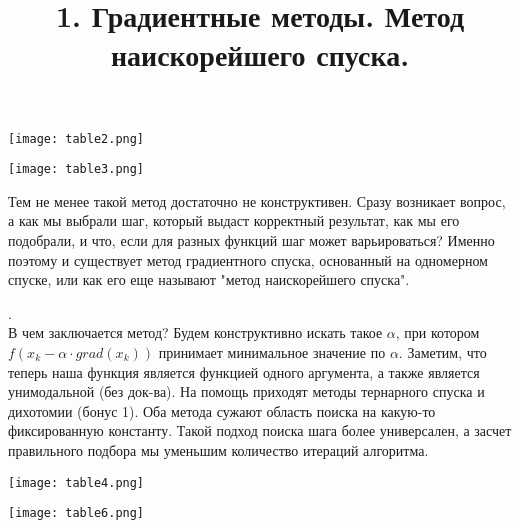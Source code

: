 \documentclass[12pt]{article}
\begin{document}
\begin{center}

\centering

\texttt{[image: table2.png]}


\label{fig:mpr}

\end{center}



\begin{center}

\centering

\texttt{[image: table3.png]}


\label{fig:mpr}

\end{center}

Тем не менее такой метод достаточно не конструктивен. Сразу возникает вопрос, а как мы выбрали шаг, который выдаст корректный результат, как мы его подобрали, и что, если для разных функций шаг может варьироваться? Именно поэтому и существует метод градиентного спуска, основанный на одномерном спуске, или как его еще называют "метод наискорейшего спуска".

\title{\textbf{1.  Градиентные методы. Метод наискорейшего спуска.}}.\\ В чем заключается метод? Будем конструктивно искать такое $\alpha$, при котором $f(x_{k} - \alpha \cdot grad(x_{k}))$ принимает минимальное значение по $\alpha$. Заметим, что теперь наша функция является функцией одного аргумента, а также является унимодальной (без док-ва). На помощь приходят методы тернарного спуска и дихотомии (бонус 1). Оба метода сужают область поиска на какую-то фиксированную константу. Такой подход поиска шага более универсален, а засчет правильного подбора мы уменьшим количество итераций алгоритма.

\begin{center}

\centering

\texttt{[image: table4.png]}


\label{fig:mpr}

\end{center}


\begin{center}

\centering

\texttt{[image: table6.png]}


\label{fig:mpr}

\end{center}
\end{document}

